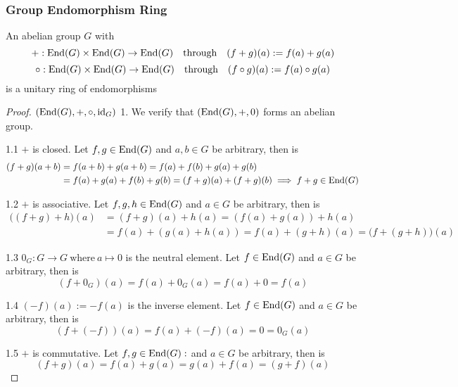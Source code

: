 \subsubsection{Group Endomorphism Ring}
\begin{proposition}
   An abelian group \(G\) with
   \[+: \operatorname{End}(G) \times \operatorname{End}(G) \to \operatorname{End}(G) \quad\text{through}\quad (f + g)(a) := f(a) + g(a)\]
   \[\circ: \operatorname{End}(G) \times \operatorname{End}(G) \to \operatorname{End}(G) \quad\text{through}\quad (f \circ g)(a) := f(a) \circ g(a)\]
   is a unitary ring of endomorphisms
\end{proposition}
\begin{proof}
 \((\operatorname{End}(G), +, \circ, \operatorname{id}_G)\)
   1. We verify that \((\operatorname{End}(G), +, 0)\) forms an abelian group.

   1.1 \(+\) is closed.
   Let \(f, g \in \operatorname{End}(G)\) and \(a, b \in G\) be arbitrary, then is
   \begin{equation*}
      \begin{split}
         (f + g)(a + b) & = f(a + b) + g(a + b) = f(a) + f(b) + g(a) + g(b)\\
                        & = f(a) + g(a) + f(b) + g(b) = (f + g)(a) + (f + g)(b) \implies f + g \in \operatorname{End}(G)
      \end{split}
   \end{equation*}

   1.2 \(+\) is associative.
   Let \(f, g, h \in \operatorname{End}(G)\) and \(a \in G\) be arbitrary, then is
   \begin{equation*}
      \begin{split}
         \big((f + g) + h\big)(a) & = (f+g)(a) + h(a) = (f(a) + g(a)) + h(a)\\
                                  & = f(a) + (g(a) + h(a)) = f(a) + (g+h)(a) = \big(f + (g + h)\big)(a)
      \end{split}
   \end{equation*}

   1.3 \(0_G: G \to G~\text{where}~a \mapsto 0\) is the neutral element.
   Let \(f \in \operatorname{End}(G)\) and \(a \in G\) be arbitrary, then is
   \[(f + 0_G)(a) = f(a) + 0_G(a) = f(a) + 0 = f(a)\]

   1.4 \((-f)(a) := -f(a)\) is the inverse element.
   Let \(f \in \operatorname{End}(G)\) and \(a \in G\) be arbitrary, then is
   \[(f + (-f))(a) = f(a) + (-f)(a) = 0 = 0_G(a)\]

   1.5 \(+\) is commutative.
   Let \(f, g \in \operatorname{End}(G):\) and \(a \in G\) be arbitrary, then is
   \[(f + g)(a) = f(a) + g(a) = g(a) + f(a) = (g + f)(a)\]


\end{proof}
